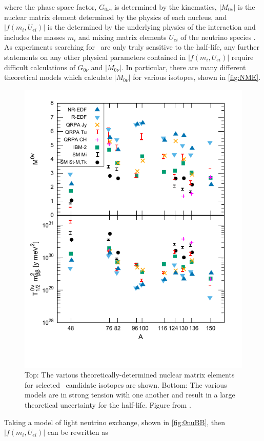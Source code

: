 where the phase space factor, $G_{0\nu}$, is determined by the kinematics, $|M_{0\nu}|$ is the nuclear matrix element determined by the physics of each nucleus, and $|f(m_i, U_{ei})|$ is the determined by the underlying physics of the interaction and includes the masses $m_i$ and mixing matrix elements $U_{ei}$ of the neutrino species \cite{Barea:2013bz}. As experiments searching for \zeronubb~are only truly sensitive to the half-life, any further statements on any other physical parameters contained in $|f(m_i, U_{ei})|$ require difficult calculations of $G_{0\nu}$ and $|M_{0\nu}|$. In particular, there are many different theoretical models which calculate $|M_{0\nu}|$ for various isotopes, shown in \autoref{fig:NME}.
\begin{figure}[htbp]
    \centering
    \includegraphics[width=0.8\linewidth]{Figures/NMEversusA.pdf}
    \caption[The various theoretically-determined nuclear matrix elements for selected \zeronubb~candidate isotopes.]{Top: The various theoretically-determined nuclear matrix elements for selected \zeronubb~candidate isotopes are shown. Bottom: The various models are in strong tension with one another and result in a large theoretical uncertainty for the half-life. Figure from \cite{Engel:NME}.}
    \label{fig:NME}
\end{figure}
Taking a model of light neutrino exchange, shown in \autoref{fig:0nuBB}, then $|f(m_i, U_{ei})|$ can be rewritten as
